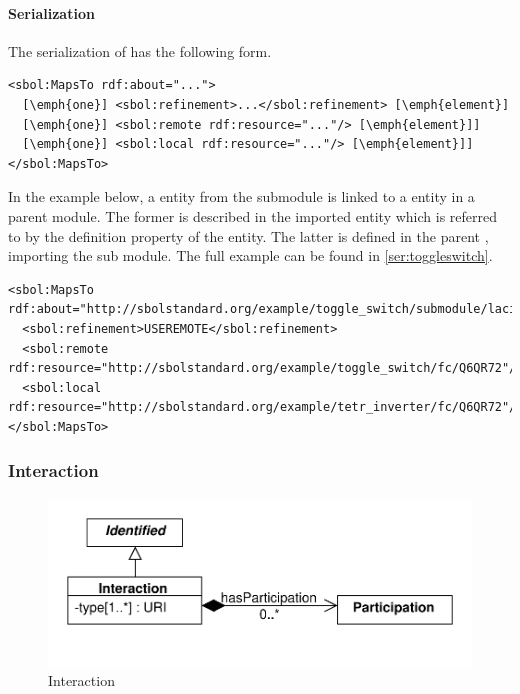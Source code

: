 \paragraph{Serialization}
The serialization of  has the following form.
\begin{lstlisting}
<sbol:MapsTo rdf:about="...">
  [\emph{one}] <sbol:refinement>...</sbol:refinement> [\emph{element}]
  [\emph{one}] <sbol:remote rdf:resource="..."/> [\emph{element}]]
  [\emph{one}] <sbol:local rdf:resource="..."/> [\emph{element}]]
</sbol:MapsTo>
\end{lstlisting}

In the example below, a  entity from the submodule is linked to a  entity in a parent module. The former is described in the imported  entity which is referred to by the definition property of the  entity. The latter is defined in the parent , importing the sub module. The full example can be found in \ref{ser:toggleswitch}.
\begin{lstlisting}
<sbol:MapsTo rdf:about="http://sbolstandard.org/example/toggle_switch/submodule/laci_inverter/mapping/Q6QR72">
  <sbol:refinement>USEREMOTE</sbol:refinement>
  <sbol:remote rdf:resource="http://sbolstandard.org/example/toggle_switch/fc/Q6QR72"/>
  <sbol:local rdf:resource="http://sbolstandard.org/example/tetr_inverter/fc/Q6QR72"/>
</sbol:MapsTo>
\end{lstlisting}



\subsubsection{Interaction}
\label{sec:Interaction}

\begin{figure}[ht]
\begin{center}
\includegraphics[scale=0.6]{uml/interaction}
\caption[]{Interaction}
\label{uml:interaction}
\end{center}
\end{figure}

